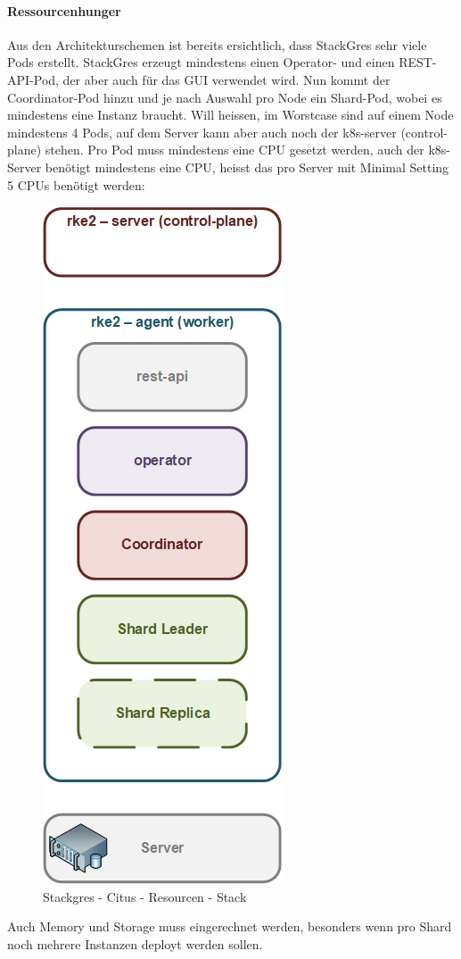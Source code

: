 \begin{flushleft}
    \paragraph{Ressourcenhunger}
    Aus den Architekturschemen ist bereits ersichtlich, dass StackGres sehr viele Pods erstellt.
    StackGres erzeugt mindestens einen Operator- und einen REST-API-Pod, der aber auch für das GUI verwendet wird.
    Nun kommt der Coordinator-Pod hinzu und je nach Auswahl pro Node ein Shard-Pod, wobei es mindestens eine Instanz braucht.
    Will heissen, im Worstcase sind auf einem Node mindestens 4 Pods, auf dem Server kann aber auch noch der k8s-server (control-plane) stehen.
    Pro Pod muss mindestens eine CPU gesetzt werden, auch der k8s-Server benötigt mindestens eine CPU, heisst das pro Server mit Minimal Setting 5 CPUs benötigt werden:
    \begin{figure}[H]
        \centering
        \includegraphics[width=0.2\linewidth]{source/implementation/evaluation/postgresql_ha_solutions/stackgres/stackgres_citus_architecture_resource_stack}
        \caption{Stackgres - Citus - Resourcen - Stack}
        \label{fig:stackgres_citus_architecture_resource_stack}
    \end{figure}
    Auch Memory und Storage muss eingerechnet werden, besonders wenn pro Shard noch mehrere Instanzen deployt werden sollen.
\end{flushleft}
\clearpage
